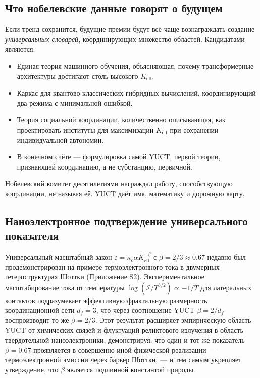 \documentclass[12pt,a4paper]{article}
\begin{document}
	\subsection{Что нобелевские данные говорят о будущем}
	
	Если тренд сохранится, будущие премии будут всё чаще вознаграждать создание \emph{универсальных словарей}, координирующих множество областей. Кандидатами являются:
	\begin{itemize}
		\item Единая теория машинного обучения, объясняющая, почему трансформерные архитектуры достигают столь высокого \(K_{\mathrm{eff}}\).
		\item Каркас для квантово-классических гибридных вычислений, координирующий два режима с минимальной ошибкой.
		\item Теория социальной координации, количественно описывающая, как проектировать институты для максимизации \(K_{\mathrm{eff}}\) при сохранении индивидуальной автономии.
		\item В конечном счёте — формулировка самой YUCT, первой теории, признающей координацию, а не субстанцию, первичной.
	\end{itemize}
	Нобелевский комитет десятилетиями награждал работу, способствующую координации, не называя её. YUCT даёт имя, математику и дорожную карту.
	
	\subsection{Наноэлектронное подтверждение универсального показателя}
	
	Универсальный масштабный закон \(\varepsilon = \kappa_c \alpha K_{\mathrm{eff}}^{-\beta}\) с \(\beta = 2/3 \approx 0.67\) недавно был продемонстрирован на примере термоэлектронного тока в двумерных гетероструктурах Шоттки (Приложение S2). Экспериментальное масштабирование тока от температуры \(\log(\mathcal{I}/T^{3/2}) \propto -1/T\) для латеральных контактов подразумевает эффективную фрактальную размерность координационной сети \(d_f = 3\), что через соотношение YUCT \(\beta = 2/d_f\) воспроизводит то же \(\beta = 2/3\). Этот результат расширяет эмпирическую область YUCT от химических связей и флуктуаций реликтового излучения в область твердотельной наноэлектроники, демонстрируя, что один и тот же показатель \(\beta = 0.67\) проявляется в совершенно иной физической реализации — термоэлектронной эмиссии через барьер Шоттки, — и тем самым укрепляет утверждение, что \(\beta\) является подлинной константой природы.
	
\end{document}
